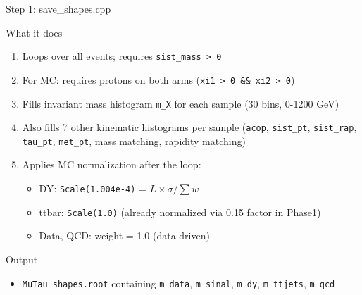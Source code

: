 \begin{frame}[fragile]{Step 1: save\_shapes.cpp}
\protect{}\label{step-1-save_shapes.cpp-1}
\begin{block}{What it does}
\protect{}\label{what-it-does}
\begin{enumerate}
\tightlist
\item
  Loops over all events; requires \texttt{sist\_mass\ \textgreater{}\ 0}
\item
  For MC: requires protons on both arms
  (\texttt{xi1\ \textgreater{}\ 0\ \&\&\ xi2\ \textgreater{}\ 0})
\item
  Fills invariant mass histogram \texttt{m\_X} for each sample (30 bins,
  0-1200 GeV)
\item
  Also fills 7 other kinematic histograms per sample (\texttt{acop},
  \texttt{sist\_pt}, \texttt{sist\_rap}, \texttt{tau\_pt},
  \texttt{met\_pt}, mass matching, rapidity matching)
\item
  Applies MC normalization after the loop:

  \begin{itemize}
  \tightlist
  \item
    DY: \texttt{Scale(1.004e-4)} = \(L \times \sigma / \sum w\)
  \item
    ttbar: \texttt{Scale(1.0)} (already normalized via 0.15 factor in
    Phase1)
  \item
    Data, QCD: weight = 1.0 (data-driven)
  \end{itemize}
\end{enumerate}
\end{block}

\begin{block}{Output}
\protect{}\label{output}
\begin{itemize}
\tightlist
\item
  \texttt{MuTau\_shapes.root} containing \texttt{m\_data},
  \texttt{m\_sinal}, \texttt{m\_dy}, \texttt{m\_ttjets}, \texttt{m\_qcd}
\end{itemize}
\end{block}
\end{frame}

